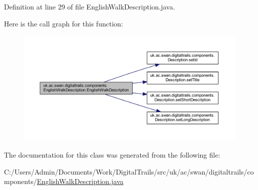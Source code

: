 Definition at line 29 of file English\+Walk\+Description.\+java.



Here is the call graph for this function\+:\nopagebreak
\begin{figure}[H]
\begin{center}
\leavevmode
\includegraphics[width=350pt]{classuk_1_1ac_1_1swan_1_1digitaltrails_1_1components_1_1_english_walk_description_a1ddd86a84daf7bf1294d8cdd0eafa138_cgraph}
\end{center}
\end{figure}




The documentation for this class was generated from the following file\+:\begin{DoxyCompactItemize}
\item 
C\+:/\+Users/\+Admin/\+Documents/\+Work/\+Digital\+Trails/src/uk/ac/swan/digitaltrails/components/\hyperlink{_english_walk_description_8java}{English\+Walk\+Description.\+java}\end{DoxyCompactItemize}

